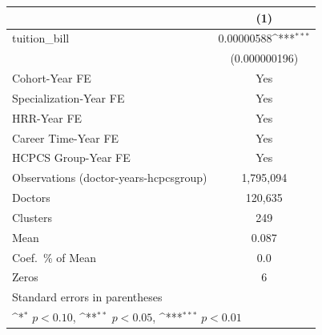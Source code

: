{
\def\sym#1{\ifmmode^{#1}\else\(^{#1}\)\fi}
\begin{tabular}{l*{1}{c}}
\hline\hline
                    &\multicolumn{1}{c}{(1)}         \\
\hline
tuition\_bill        &  0.00000588\sym{***}\\
                    &(0.000000196)         \\
[1em]
Cohort-Year FE      &         Yes         \\
[1em]
Specialization-Year FE&         Yes         \\
[1em]
HRR-Year FE         &         Yes         \\
[1em]
Career Time-Year FE &         Yes         \\
[1em]
HCPCS Group-Year FE &         Yes         \\
\hline
Observations (doctor-years-hcpcsgroup)&   1,795,094         \\
Doctors             &     120,635         \\
Clusters            &         249         \\
Mean                &       0.087         \\
Coef.\ \% of Mean   &         0.0         \\
Zeros               &           6         \\
\hline\hline
\multicolumn{2}{l}{\footnotesize Standard errors in parentheses}\\
\multicolumn{2}{l}{\footnotesize \sym{*} \(p<0.10\), \sym{**} \(p<0.05\), \sym{***} \(p<0.01\)}\\
\end{tabular}
}
